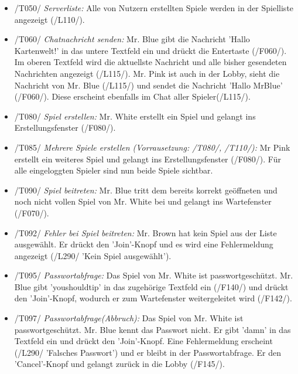 \documentclass{article}
\begin{document}
\begin{itemize}
\begin{itemize}
		\item /T050/ \textit{Serverliste:} Alle von Nutzern erstellten Spiele werden in der Spielliste angezeigt (/L110/).
	
		\item /T060/ \textit{Chatnachricht senden:} Mr. Blue gibt die Nachricht 'Hallo Kartenwelt!' in das untere Textfeld ein und drückt die Entertaste (/F060/). Im oberen Textfeld wird die aktuellste Nachricht und alle bisher gesendeten Nachrichten angezeigt (/L115/). Mr. Pink ist auch in der Lobby, sieht die Nachricht von Mr. Blue (/L115/) und sendet die Nachricht 'Hallo MrBlue' (/F060/). Diese erscheint ebenfalls im Chat aller Spieler(/L115/).
		
		\item /T080/ \textit{Spiel erstellen:} Mr. White erstellt ein Spiel und gelangt ins Erstellungsfenster (/F080/).
		
		\item /T085/ \textit{Mehrere Spiele erstellen (Vorrausetzung: /T080/, /T110/):} Mr Pink erstellt ein weiteres Spiel und gelangt ins Erstellungsfenster (/F080/). Für alle eingeloggten Spieler sind nun beide Spiele sichtbar.
		
		\item /T090/ \textit{Spiel beitreten:} Mr. Blue tritt dem bereits korrekt geöffneten und noch nicht vollen Spiel von Mr. White bei und gelangt ins Wartefenster (/F070/).
		
		\item /T092/ \textit{Fehler bei Spiel beitreten:} Mr. Brown hat kein Spiel aus der Liste ausgewählt. Er drückt den 'Join'-Knopf und es wird eine Fehlermeldung angezeigt (/L290/ 'Kein Spiel ausgewählt').
		
		\item /T095/ \textit{Passwortabfrage:} Das Spiel von Mr. White ist passwortgeschützt. Mr. Blue gibt 'youshouldtip' in das zugehörige Textfeld ein (/F140/) und drückt den 'Join'-Knopf, wodurch er zum Wartefenster weitergeleitet wird (/F142/). 
		
		
		\item /T097/ \textit{Passwortabfrage(Abbruch):} Das Spiel von Mr. White ist passwortgeschützt. Mr. Blue kennt das Passwort nicht. Er gibt 'damn' in das Textfeld ein und drückt den 'Join'-Knopf. Eine Fehlermeldung erscheint (/L290/ 'Falsches Passwort') und er bleibt in der Passwortabfrage. Er den 'Cancel'-Knopf und gelangt zurück in die Lobby (/F145/).
			  
	\end{itemize}
	

\end{itemize}
\end{document}
